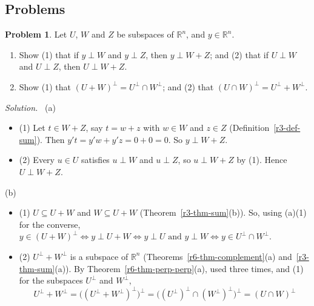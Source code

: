 \documentclass[12pt]{article}
\newcommand{\R}{\mathbb R}
\theoremstyle{definition}
\newtheorem{problem}{Problem}
\newenvironment{solution}{\par\noindent\textit{Solution.}\ }{\par\smallskip}
\begin{document}
\subsection*{Problems}

\begin{problem}\label{r6-ex-complement-sum}
Let \(U\), \(W\) and \(Z\) be subspaces of \(\R^n\), and \(y\in\R^n\).
\begin{enumerate}
\item Show (1) that if \(y\perp W\) and \(y\perp Z\), then \(y\perp W+Z\); and (2) that if \(U\perp W\) and
\(U\perp Z\), then \(U\perp W+Z\).
\item Show (1) that \((U+W)^\perp=U^\perp\cap W^\perp\); and (2) that \((U\cap W)^\perp=U^\perp+W^\perp\).
\end{enumerate}
\end{problem}
\begin{solution}
(a)
\begin{itemize}
\item (1) Let \(t\in W+Z\), say \(t=w+z\) with \(w\in W\) and \(z\in Z\) (Definition~\ref{r3-def-sum}). Then
\(y't=y'w+y'z=0+0=0\). So \(y\perp W+Z\).
\item (2) Every \(u\in U\) satisfies \(u\perp W\) and \(u\perp Z\), so \(u\perp W+Z\) by (1). Hence \(U\perp W+Z\).
\end{itemize}
(b)
\begin{itemize}
\item (1) \(U\subseteq U+W\) and \(W\subseteq U+W\) (Theorem~\ref{r3-thm-sum}(b)). So, using (a)(1) for the
converse,
\(y\in(U+W)^\perp\iff y\perp U+W\iff y\perp U\text{ and }y\perp W\iff y\in U^\perp\cap W^\perp\).
\item (2) \(U^\perp+W^\perp\) is a subspace of \(\R^n\) (Theorems~\ref{r6-thm-complement}(a)
and~\ref{r3-thm-sum}(a)). By Theorem~\ref{r6-thm-perp-perp}(a), used three times, and (1) for the subspaces
\(U^\perp\) and \(W^\perp\),
\[
U^\perp+W^\perp=\bigl((U^\perp+W^\perp)^\perp\bigr)^\perp=\bigl((U^\perp)^\perp\cap(W^\perp)^\perp\bigr)^\perp
=(U\cap W)^\perp
\]
\end{itemize}
\end{solution}
\end{document}
